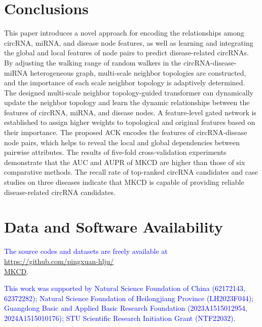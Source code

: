 \documentclass[journal=jcisd8,manuscript=article]{achemso}
\begin{document}
\section{Conclusions}
\vspace{-0.3cm}
This paper introduces a novel approach for encoding the relationships among circRNA, miRNA, and disease node features, as well as learning and integrating the global and local features of node pairs to predict disease-related circRNAs. By adjusting the walking range of random walkers in the circRNA-disease-miRNA heterogeneous graph, multi-scale neighbor topologies are constructed, and the importance of each scale neighbor topology is adaptively determined. The designed multi-scale neighbor topology-guided transformer can dynamically update the neighbor topology and learn the dynamic relationships between the features of circRNA, miRNA, and disease nodes. A feature-level gated network is established to assign higher weights to topological and original features based on their importance. The proposed ACK encodes the features of circRNA-disease node pairs, which helps to reveal the local and global dependencies between pairwise attributes. The results of five-fold cross-validation experiments demonstrate that the AUC and AUPR of MKCD are higher than those of six comparative methods. The recall rate of top-ranked circRNA candidates and case studies on three diseases indicate that MKCD is capable of providing reliable disease-related circRNA candidates.
\vspace{-0.5cm}

\section{Data and Software Availability}
\vspace{-0.3cm}
\noindent %
\textcolor{blue}{The source codes and datasets are freely available at \href{https://github.com/pingxuan-hlju/MKCD}{https://github.com/pingxuan-hlju/\\MKCD}.}

\begin{acknowledgement}
\vspace{-0.3cm}
\noindent %
\textcolor{blue}{This work was supported by Natural Science Foundation of China (62172143, 62372282); Natural Science Foundation of Heilongjiang Province (LH2023F044);
Guangdong Basic and Applied Basic Research Foundation (2023A1515012954, 2024A1515010176); STU Scientific Research Initiation Grant (NTF22032).}
\vspace{-0.5cm}
\end{acknowledgement}
\end{document}
